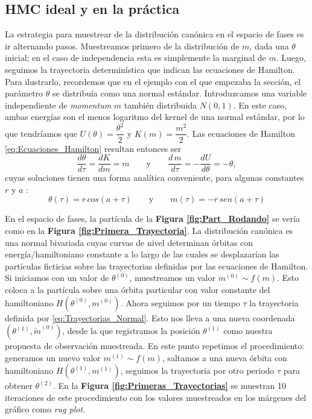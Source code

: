 \subsection{HMC ideal y en la práctica} 
 
 La estrategia para muestrear de la distribución canónica en el espacio de fases es ir alternando pasos. Muestreamos primero de la distribución de $m$, dada una $\theta$ inicial; en el caso de independencia esta es simplemente la marginal de $m$. Luego, seguimos la trayectoria determinística que indican las ecuaciones de Hamilton.\\
 
 Para ilustrarlo, recordemos que en el ejemplo con el que empezaba la sección, el parámetro $\theta$ se distribuía como una normal estándar. Introduzcamos una variable independiente de \textit{momentum} $m$ también distribuida $N(0,1)$. En este caso, ambas energías son el menos logaritmo del kernel de una normal estándar, por lo que tendríamos que $U(\theta)=\dfrac{\theta^2}{2}$ y $K(m)=\dfrac{m^2}{2}$. Las ecuaciones de Hamilton \eqref{eq:Ecuaciones_Hamilton} resultan entonces ser
 \begin{equation*}
 \dfrac{d\theta}{d\tau}= \dfrac{dK}{dm} = m \qquad \text{y} \qquad \dfrac{d\,m}{d\tau}= -\dfrac{dU}{d\theta} = -\theta,
 \end{equation*}
 cuyas soluciones tienen una forma analítica conveniente, para algunas constantes $r$ y $a$ \parencite{Neal11}:
 \begin{equation}
 \label{eq:Trayectorias_Normal}
 \theta(\tau) = r\,cos(a + \tau) \qquad \text{y} \qquad m(\tau) = -r\,sen(a + \tau)
 \end{equation}
 
 En el espacio de fases, la partícula de la \textbf{Figura \ref{fig:Part_Rodando}} se vería como en la \textbf{Figura \ref{fig:Primera_Trayectoria}}. La distribución canónica es una normal bivariada cuyas curvas de nivel determinan órbitas con energía/hamiltoniano constante a lo largo de las cuales se desplazarían las partículas ficticias sobre las trayectorias definidas por las ecuaciones de Hamilton.\\ 
 
 Si iniciamos con un valor de $\theta^{(0)}$, muestreamos un valor $m^{(0)} \sim f(m)$. Esto coloca a la partícula sobre una órbita particular con valor constante del hamiltoniano $H(\theta^{(0)},m^{(0)})$. Ahora seguimos por un tiempo $\tau$ la trayectoria definida por \eqref{eq:Trayectorias_Normal}. Esto nos lleva a una nueva coordenada $(\theta^{(1)},\tilde{m}^{(0)})$, desde la que registramos la posición $\theta^{(1)}$ como nuestra propuesta de observación muestreada. En este punto repetimos el procedimiento: generamos un nuevo valor $m^{(1)} \sim f(m)$, saltamos a una nueva órbita con hamiltoniano $H(\theta^{(1)},m^{(1)})$, seguimos la trayectoria por otro periodo $\tau$ para obtener $\theta^{(2)}$. En la \textbf{Figura \ref{fig:Primeras_Trayectorias}} se muestran 10 iteraciones de este procedimiento con los valores muestreados en los márgenes del gráfico como \textit{rug plot}.\\ 


